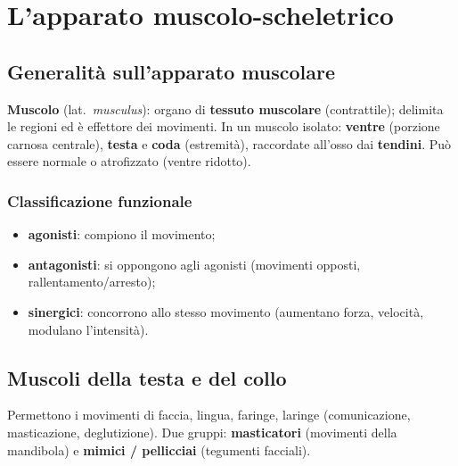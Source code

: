 \chapter{L'apparato muscolo-scheletrico}

\section{Generalità sull'apparato muscolare}

\textbf{Muscolo} (lat.\ \textit{musculus}): organo di \textbf{tessuto muscolare} (contrattile);
delimita le regioni ed è effettore dei movimenti. In un muscolo isolato: \textbf{ventre} (porzione
carnosa centrale), \textbf{testa} e \textbf{coda} (estremità), raccordate all'osso dai
\textbf{tendini}. Può essere normale o atrofizzato (ventre ridotto).

\subsection{Classificazione funzionale}
\begin{itemize}
  \item \textbf{agonisti}: compiono il movimento;
  \item \textbf{antagonisti}: si oppongono agli agonisti (movimenti opposti, rallentamento/arresto);
  \item \textbf{sinergici}: concorrono allo stesso movimento (aumentano forza, velocità, modulano
    l'intensità).
\end{itemize}

\section{Muscoli della testa e del collo}

Permettono i movimenti di faccia, lingua, faringe, laringe (comunicazione, masticazione,
deglutizione). Due gruppi: \textbf{masticatori} (movimenti della mandibola) e \textbf{mimici /
pellicciai} (tegumenti facciali).

